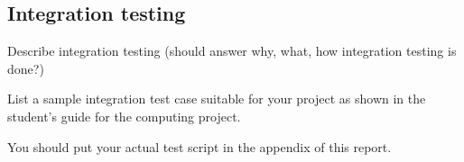 \subsection{Integration testing} %
\label{sub:integration_testing}
Describe integration testing (should answer why, what, how integration testing is done?)

List a sample integration test case suitable for your project as shown in the student's guide for the computing project.

You should put your actual test script in the appendix of this report.
